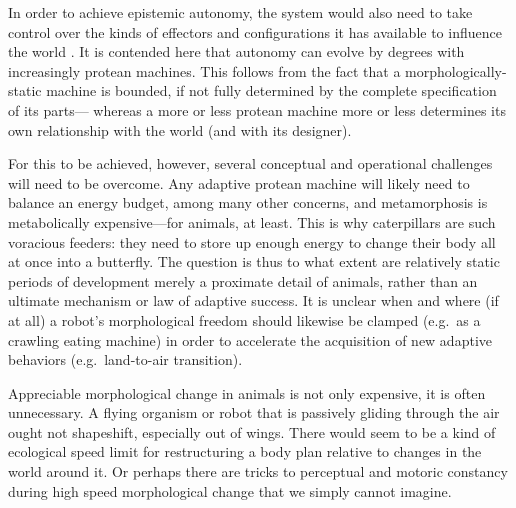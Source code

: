 
In order to achieve epistemic autonomy,
the system would also need to take control over the kinds 
of effectors and
configurations
it has available to influence the world \cite{cariani1993evolve}.
It is contended here that autonomy can evolve by degrees with increasingly protean machines.
This follows from the fact that a morphologically-static machine is bounded, if not fully determined by the complete specification of its parts---%
whereas a more or less protean machine more or less determines its own relationship with the world (and with its designer).



For this to be achieved, however, several conceptual and operational challenges will need to be overcome. 
Any adaptive protean machine will
likely
need to balance an energy budget,
among many other concerns,
and metamorphosis is metabolically expensive---for animals, at least.
This is why caterpillars are such
voracious feeders:
they need to store up enough energy to change their body all at once into a butterfly.
The question is thus to what extent are relatively static periods of development 
merely a proximate detail of animals,
rather than an ultimate mechanism \cite{tinbergen1963aims} or law of adaptive success.
It is unclear
when and where (if at all) a robot's morphological freedom should likewise be clamped (e.g.~as a crawling 
eating machine) in order to accelerate the acquisition of new adaptive behaviors (e.g.~land-to-air transition).

Appreciable 
morphological
change
in animals
is not only expensive, it is often unnecessary.
A flying organism or robot that is passively gliding through the air
ought not shapeshift, especially out of wings.
There would seem to be a kind of ecological speed limit for restructuring a body plan relative to changes in the world around it.
Or perhaps there are tricks to perceptual and motoric constancy during high speed morphological change that we simply cannot imagine.

